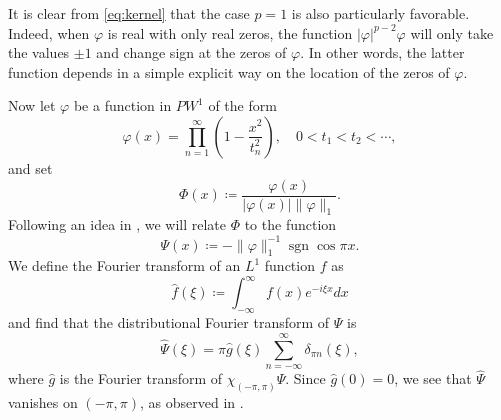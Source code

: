 \documentclass[12pt]{amsart}
\theoremstyle{plain}
\begin{document}
It is clear from \eqref{eq:kernel} that the case $p=1$ is also particularly favorable. Indeed, when $\varphi$ is real with only real zeros, the function $|\varphi|^{p-2}\varphi $ will only take the values $\pm 1$ and change sign at the zeros of $\varphi$. In other words, the latter function depends in a simple explicit way on the location of the zeros of $\varphi$. 

Now let $\varphi$ be a function in $PW^1$ of the form
\begin{equation} \label{eq:prod} \varphi(x) = \prod_{n=1}^\infty \left(1-\frac{x^2}{t_n^2}\right), \quad 0<t_1 < t_2 < \cdots, \end{equation}
  and set
\[ \Phi(x)\coloneqq \frac{\varphi(x)}{|\varphi(x)| \|\varphi\|_{1}}. \]
Following an idea in \cite[p. 188]{HB93}, we will  relate $\Phi$ to the function 
\[ \Psi(x)\coloneqq - \| \varphi \|_1^{-1} \operatorname{sgn} \cos \pi x .\] 
We define the Fourier transform of an $L^1$ function $f$ as
\[ \widehat{f}(\xi)\coloneqq \int_{-\infty}^\infty f(x) e^{-i\xi x} dx \] and find that the distributional Fourier transform of $\Psi$ is
\[ \widehat{\Psi}(\xi)=  \pi \widehat{g}(\xi)\sum_{n=-\infty}^{\infty} \delta_{\pi n}(\xi), \]
where $\widehat{g}$ is the Fourier transform of $\chi_{(-\pi,\pi)}\Psi$. Since $\widehat{g}(0)=0$, we see  that  $\widehat{\Psi}$ vanishes on $(-\pi,\pi)$, as observed in \cite[p. 188]{HB93}.
\end{document}
